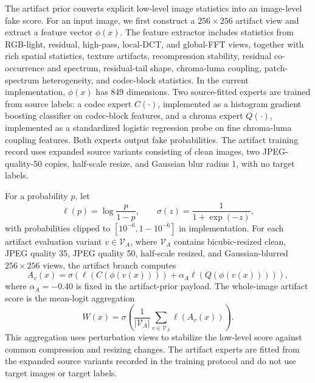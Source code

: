 \documentclass[lettersize,journal]{IEEEtran}
\begin{document}
The artifact prior converts explicit low-level image statistics into an image-level fake score. For an input image, we first construct a $256 \times 256$ artifact view and extract a feature vector $\phi(x)$. The feature extractor includes statistics from RGB-light, residual, high-pass, local-DCT, and global-FFT views, together with rich spatial statistics, texture artifacts, recompression stability, residual co-occurrence and spectrum, residual-tail shape, chroma-luma coupling, patch-spectrum heterogeneity, and codec-block statistics. In the current implementation, $\phi(x)$ has 849 dimensions. Two source-fitted experts are trained from source labels: a codec expert $C(\cdot)$, implemented as a histogram gradient boosting classifier on codec-block features, and a chroma expert $Q(\cdot)$, implemented as a standardized logistic regression probe on fine chroma-luma coupling features. Both experts output fake probabilities. The artifact training record uses expanded source variants consisting of clean images, two JPEG-quality-50 copies, half-scale resize, and Gaussian blur radius 1, with no target labels.

For a probability $p$, let
\begin{equation}
    \ell(p)=\log \frac{p}{1-p}, \qquad
    \sigma(z)=\frac{1}{1+\exp(-z)},
\end{equation}
with probabilities clipped to $[10^{-6},1-10^{-6}]$ in implementation. For each artifact evaluation variant $v \in \mathcal{V}_{A}$, where $\mathcal{V}_{A}$ contains bicubic-resized clean, JPEG quality 35, JPEG quality 50, half-scale resized, and Gaussian-blurred $256 \times 256$ views, the artifact branch computes
\begin{equation}
    A_v(x)=\sigma\left(\ell(C(\phi(v(x))))+\alpha_A \ell(Q(\phi(v(x))))\right),
\end{equation}
where $\alpha_A=-0.40$ is fixed in the artifact-prior payload. The whole-image artifact score is the mean-logit aggregation
\begin{equation}
    W(x)=\sigma\left(\frac{1}{|\mathcal{V}_{A}|}\sum_{v\in\mathcal{V}_{A}}\ell(A_v(x))\right).
\end{equation}
This aggregation uses perturbation views to stabilize the low-level score against common compression and resizing changes. The artifact experts are fitted from the expanded source variants recorded in the training protocol and do not use target images or target labels.
\end{document}
